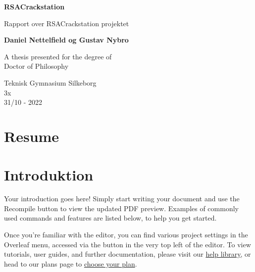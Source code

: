 \documentclass{article}
\begin{document}
    \begin{titlepage}
        \begin{center}
            \vspace*{1cm}

            \textbf{RSACrackstation}

            \vspace{0.5cm}
            Rapport over RSACrackstation projektet

            \vspace{1.5cm}

            \textbf{Daniel Nettelfield og Gustav Nybro}

            \vfill

            A thesis presented for the degree of\\
            Doctor of Philosophy

            \vspace{0.8cm}



            Teknisk Gymnasium Silkeborg\\
            3x\\
            31/10 - 2022

        \end{center}
    \end{titlepage}

    \newpage



    \tableofcontents


    \section{Resume}\label{sec:resume}


    \section{Introduktion}\label{sec:introduktion}

    Your introduction goes here! Simply start writing your document and use the Recompile button to view the 
    updated PDF preview. Examples of commonly used commands and features are listed below, to help you get started.

    Once you're familiar with the editor, you can find various project settings in the Overleaf menu, accessed 
    via the button in the very top left of the editor. To view tutorials, user guides, and further documentation, 
    please visit our \href{https://www.overleaf.com/learn}{help library}, or head to our plans page to 
    \href{https://www.overleaf.com/user/subscription/plans}{choose your plan}.
\end{document}
